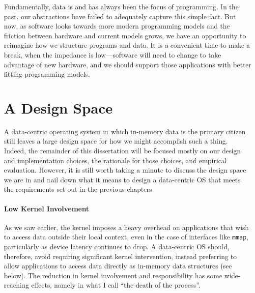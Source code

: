 Fundamentally, data is and has always been the focus of programming. In the past, our abstractions have failed to
adequately capture this simple fact. But now, as software looks towards more modern programming models and the friction
between hardware and current models grows, we have an opportunity to reimagine how we structure programs and data.
It is a convenient time to make a break, when the impedance is low---software will need to change to take advantage of
new hardware, and we should support those applications with better fitting programming models.





\section{A Design Space}

A data-centric operating system in which in-memory data is the primary citizen still leaves a large design space for how
we might accomplish such a thing. Indeed, the remainder of this dissertation will be focused mostly on our design and
implementation choices, the rationale for those choices, and empirical evaluation. However, it is still worth taking a
minute to discuss the design space we are in and nail down what it means to design a data-centric OS that meets the
requirements set out in the previous chapters.

\paragraph{Low Kernel Involvement} As we saw earlier, the kernel imposes a heavy overhead on applications that wish to
access data outside their local context, even in the case of interfaces like \texttt{mmap}, particularly as device
latency continues to drop. A data-centric OS should, therefore, avoid requiring significant kernel intervention, instead
preferring to allow applications to access data directly as in-memory data structures (see below). The reduction in
kernel involvement and responsibility has some wide-reaching effects, namely in what I call ``the death of the process''.

